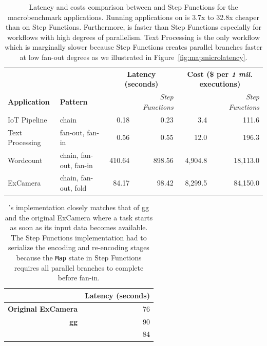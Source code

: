 \begin{table}[t]
	\centering
	\begin{tabular}{ll|rr|rr}
		\hline
		&                        & \multicolumn{2}{c}{\textbf{Latency (seconds)}}            & \multicolumn{2}{c}{\textbf{Cost (\$ per \emph{1 mil.} executions)}}       \\
		\textbf{Application} & \textbf{Pattern}       & \textit{\name{}} & \textit{Step Functions}   & \textit{\name{}} & \textit{Step Functions}            \\ \hline
		IoT Pipeline         & chain                  & 0.18       & 0.23       & 3.4       & 111.6   \\
		Text Processing      & fan-out, fan-in        & 0.56       & 0.55       & 12.0      & 196.3   \\
		Wordcount            & chain, fan-out, fan-in & 410.64     & 898.56     & 4,904.8   & 18,113.0 \\
		ExCamera             & chain, fan-out, fold   & 84.17      & 98.42      & 8,299.5   & 84,150.0      \\ \hline
	\end{tabular}
	\caption{Latency and costs comparison between \name{} and Step Functions for
		the macrobenchmark applications. Running applications on \name{} is 3.7x to
		32.8x cheaper than on Step Functions. Furthermore, \name{} is faster than Step
		Functions especially for workflows with high degrees of parallelism. Text
		Processing is the only workflow which \name{} is marginally slower because
		Step Functions creates parallel branches faster at low fan-out degrees as we
		illustrated in Figure~\ref{fig:mapmicrolatency}.}
	\label{table:macro}
\end{table}

\begin{table}[]
	\centering
	\begin{tabular}{|r|r|}
		\hline
		& \textbf{Latency (seconds)} \\ \hline
		\textbf{Original ExCamera}        & 76                         \\ \hline
		\textbf{gg}                       & 90                         \\ \hline
		\textbf{\name{}} & 84                         \\ \hline
	\end{tabular}
	\caption{\name{}'s implementation closely matches that of gg and the original
		ExCamera where a task starts as soon as its input data becomes available. The
		Step Functions implementation had to serialize the encoding and re-encoding
		stages because the \texttt{Map} state in Step Functions requires all parallel
		branches to complete before fan-in.}
	\label{table:excamera}
\end{table}

